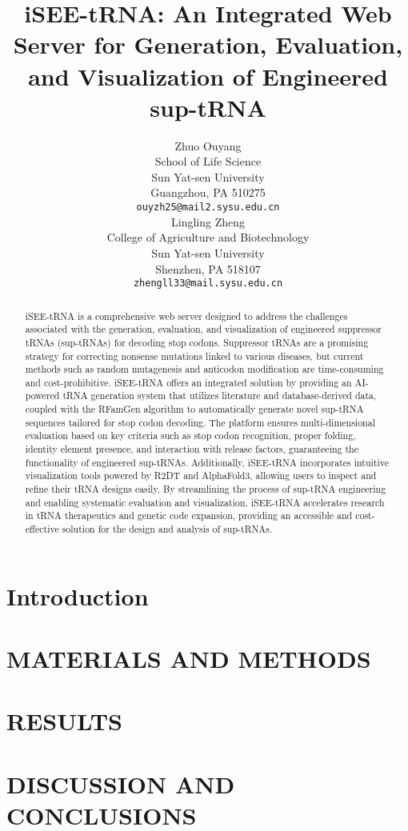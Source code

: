\documentclass{article}
\title{iSEE-tRNA: An Integrated Web Server for Generation, Evaluation, and Visualization of Engineered sup-tRNA}
\author{
 Zhuo Ouyang \\
  School of Life Science\\
  Sun Yat-sen University\\
  Guangzhou, PA 510275 \\
  \texttt{ouyzh25@mail2.sysu.edu.cn} \\
   \And
 Lingling Zheng \\
  College of Agriculture and Biotechnology\\
  Sun Yat-sen University\\
  Shenzhen, PA 518107 \\
  \texttt{zhengll33@mail.sysu.edu.cn} \\
  \And
}
\begin{document}
\maketitle
\begin{abstract}
    iSEE-tRNA is a comprehensive web server designed to address the challenges associated with the generation, evaluation, and visualization of engineered suppressor tRNAs (sup-tRNAs) for decoding stop codons. Suppressor tRNAs are a promising strategy for correcting nonsense mutations linked to various diseases, but current methods such as random mutagenesis and anticodon modification are time-consuming and cost-prohibitive. iSEE-tRNA offers an integrated solution by providing an AI-powered tRNA generation system that utilizes literature and database-derived data, coupled with the RFamGen algorithm to automatically generate novel sup-tRNA sequences tailored for stop codon decoding. The platform ensures multi-dimensional evaluation based on key criteria such as stop codon recognition, proper folding, identity element presence, and interaction with release factors, guaranteeing the functionality of engineered sup-tRNAs. Additionally, iSEE-tRNA incorporates intuitive visualization tools powered by R2DT and AlphaFold3, allowing users to inspect and refine their tRNA designs easily. By streamlining the process of sup-tRNA engineering and enabling systematic evaluation and visualization, iSEE-tRNA accelerates research in tRNA therapeutics and genetic code expansion, providing an accessible and cost-effective solution for the design and analysis of sup-tRNAs.
    \end{abstract}

\section{Introduction}


\section{MATERIALS AND METHODS}


\section{RESULTS}


\section{DISCUSSION AND CONCLUSIONS}


  
\end{document}
